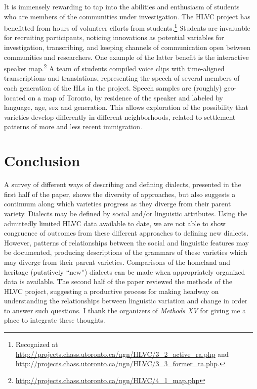 \documentclass[output=paper]{LSP/langsci}
\begin{document}
It is immensely rewarding to tap into the abilities and enthusiasm of students who are members of the communities under investigation. The HLVC project has benefitted from hours of volunteer efforts from students.\footnote{Recognized at \url{http://projects.chass.utoronto.ca/ngn/HLVC/3_2_active_ra.php} and \url{http://projects.chass.utoronto.ca/ngn/HLVC/3_3_former_ra.php}.} Students are invaluable for recruiting participants, noticing innovations as potential variables for investigation, transcribing, and keeping channels of communication open between communities and researchers. One example of the latter benefit is the interactive speaker map.\footnote{\url{http://projects.chass.utoronto.ca/ngn/HLVC/4_1_map.php}} A team of students compiled voice clips with time-aligned transcriptions and translations, representing the speech of several members of each generation of the HLs in the project. Speech samples are (roughly) geo-located on a map of Toronto, by residence of the speaker and labeled by language, age, sex and generation. This allows exploration of the possibility that varieties develop differently in different neighborhoods, related to settlement patterns of more and less recent immigration. 

\section{Conclusion}
A survey of different ways of describing and defining dialects, presented in the first half of the paper, shows the diversity of approaches, but also suggests a continuum along which varieties progress as they diverge from their parent variety. Dialects may be defined by social and/or linguistic attributes. Using the admittedly limited HLVC data available to date, we are not able to show congruence of outcomes from these different approaches to defining new dialects. However, patterns of relationships between the social and linguistic features may be documented, producing descriptions of the grammars of these varieties which may diverge from their parent varieties. Comparisons of the homeland and heritage (putatively “new”) dialects can be made when appropriately organized data is available. The second half of the paper reviewed the methods of the HLVC project, suggesting a productive process for making headway on understanding the relationships between linguistic variation and change in order to answer such questions. I thank the organizers of \textit{Methods XV} for giving me a place to integrate these thoughts. 
\end{document}
